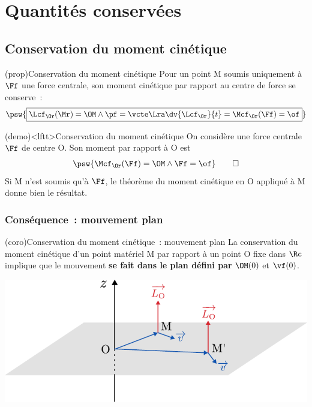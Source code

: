 \documentclass[../../main/main.tex]{subfiles}
\begin{document}
\section{Quantités conservées}
\subsection{Conservation du moment cinétique}
\vspace{-5pt}
\begin{tcb*}(prop){Conservation du moment cinétique}
	Pour un point M soumis uniquement à $\Ff$ une force centrale, son moment
	cinétique par rapport au centre de force se conserve~:
	\[
		\psw{
			\boxed{
				\Lcf_\Or(\Mr) = \OM\wedge\pf = \vcte
				\Lra
				\dv{\Lcf_\Or}{t} = \Mcf_\Or(\Ff) = \of
			}
		}
	\]
\end{tcb*}

\begin{tcb*}(demo)<lftt>{Conservation du moment cinétique}
	On considère une force centrale $\Ff$ de centre O. Son moment par rapport à O
	est
	\begin{gather*}
		\psw{\Mcf_\Or(\Ff) = \OM\wedge\Ff = \of}
		\qed
	\end{gather*}
	Si M n'est soumis qu'à $\Ff$, le théorème du moment cinétique en O appliqué à
	M donne bien le résultat.
\end{tcb*}

\subsubsection{Conséquence~: mouvement plan}

\begin{tcb*}[sidebyside](coro){Conservation du moment cinétique~: mouvement
			plan}
	La conservation du moment cinétique d'un point matériel M par rapport à un
	point O fixe dans $\Rc$ implique que le mouvement \textbf{se fait dans le
		plan défini par} $\OM(0)$ et $\vf(0)$.
	\tcblower
	\begin{center}
		\includegraphics[width=\linewidth]{mvt_plan}
	\end{center}
\end{tcb*}
\end{document}
